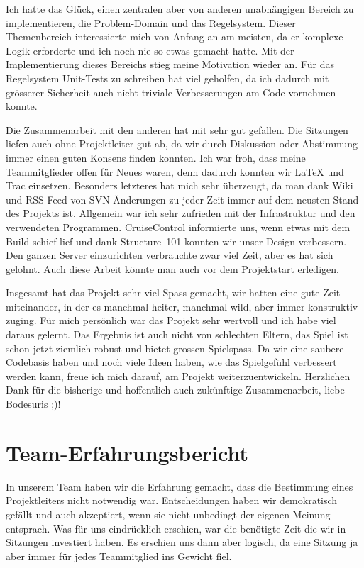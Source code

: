 \documentclass[12pt,halfparskip]{scrartcl}
\begin{document}
Ich hatte das Glück, einen zentralen aber von anderen unabhängigen Bereich zu implementieren, die Problem-Domain und das Regelsystem. Dieser Themenbereich interessierte mich von Anfang an am meisten, da er komplexe Logik erforderte und ich noch nie so etwas gemacht hatte. Mit der Implementierung dieses Bereichs stieg meine Motivation wieder an. Für das Regelsystem Unit-Tests zu schreiben hat viel geholfen, da ich dadurch mit grösserer Sicherheit auch nicht-triviale Verbesserungen am Code vornehmen konnte.

Die Zusammenarbeit mit den anderen hat mit sehr gut gefallen. Die Sitzungen liefen auch ohne Projektleiter gut ab, da wir durch Diskussion oder Abstimmung immer einen guten Konsens finden konnten. Ich war froh, dass meine Teammitglieder offen für Neues waren, denn dadurch konnten wir \LaTeX{} und Trac einsetzen. Besonders letzteres hat mich sehr überzeugt, da man dank Wiki und RSS-Feed von SVN-Änderungen zu jeder Zeit immer auf dem neusten Stand des Projekts ist. Allgemein war ich sehr zufrieden mit der Infrastruktur und den verwendeten Programmen. CruiseControl informierte uns, wenn etwas mit dem Build schief lief und dank Structure~101 konnten wir unser Design verbessern. Den ganzen Server einzurichten verbrauchte zwar viel Zeit, aber es hat sich gelohnt. Auch diese Arbeit könnte man auch vor dem Projektstart erledigen.

Insgesamt hat das Projekt sehr viel Spass gemacht, wir hatten eine gute Zeit miteinander, in der es manchmal heiter, manchmal wild, aber immer konstruktiv zuging. Für mich persönlich war das Projekt sehr wertvoll und ich habe viel daraus gelernt. Das Ergebnis ist auch nicht von schlechten Eltern, das Spiel ist schon jetzt ziemlich robust und bietet grossen Spielspass. Da wir eine saubere Codebasis haben und noch viele Ideen haben, wie das Spielgefühl verbessert werden kann, freue ich mich darauf, am Projekt weiterzuentwickeln. Herzlichen Dank für die bisherige und hoffentlich auch zukünftige Zusammenarbeit, liebe Bodesuris ;)!

\section{Team-Erfahrungsbericht}
In unserem Team haben wir die Erfahrung gemacht, dass die Bestimmung eines Projektleiters nicht notwendig war. Entscheidungen haben wir demokratisch gefällt und auch akzeptiert, wenn sie nicht unbedingt der eigenen Meinung entsprach. Was für uns eindrücklich erschien, war die benötigte Zeit die wir in Sitzungen investiert haben. Es erschien uns dann aber logisch, da eine Sitzung ja aber immer für jedes Teammitglied ins Gewicht fiel.
\end{document}
